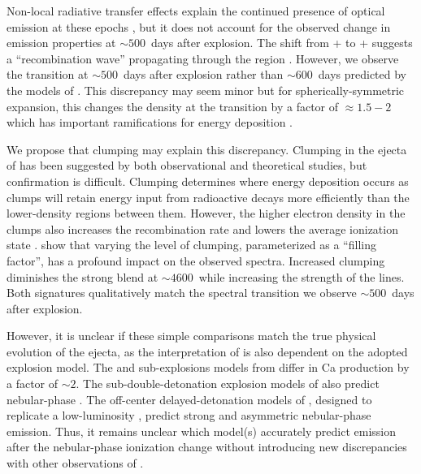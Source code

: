 \documentclass[twocolumn]{aastex63}
\begin{document}
Non-local radiative transfer effects explain the continued presence of optical emission at these epochs \citep{fransson2015}, but it does not account for the observed change in emission properties at $\sim 500$~days after explosion. The shift from + to + suggests a ``recombination wave'' propagating through the  region \citep{graur2020}. However, we observe the transition at $\sim 500$~days after explosion rather than $\sim 600$~days predicted by the models of \citet[][see their Fig. 1]{fransson2015}. This discrepancy may seem minor but for spherically-symmetric expansion, this changes the density at the transition by a factor of $\approx 1.5-2$ which has important ramifications for energy deposition \citep[c.f., ][]{axelrod1980}. 

We propose that clumping may explain this discrepancy. Clumping in the ejecta of \sneia has been suggested by both observational \citep[e.g., ][]{black2016, mazzali2020} and theoretical \citep[e.g., ][]{wilk2020} studies, but confirmation is difficult. Clumping determines where energy deposition occurs as clumps will retain energy input from radioactive decays more efficiently than the lower-density regions between them. However, the higher electron density in the clumps also increases the recombination rate and lowers the average ionization state \citep[e.g., ][]{mazzali2020}. \citet{wilk2020} show that varying the level of clumping, parameterized as a ``filling factor'', has a profound impact on the observed spectra. Increased clumping diminishes the strong  blend at $\sim 4600$~\AAA while increasing the strength of the \CaII lines. Both signatures qualitatively match the spectral transition we observe $\sim 500$~days after explosion. 

However, it is unclear if these simple comparisons match the true physical evolution of the ejecta, as the interpretation of \CaII is also dependent on the adopted explosion model. The \Mch and sub-\Mch explosions models from \citet{wilk2020} differ in Ca production by a factor of $\sim 2$. The sub-\Mch double-detonation explosion models of \citet{polin2021} also predict nebular-phase \CaII. The off-center \Mch delayed-detonation models of \citet{hoeflich2021}, designed to replicate a low-luminosity \snia, predict strong and asymmetric nebular-phase \CaII emission. Thus, it remains unclear which model(s) accurately predict \CaII emission after the nebular-phase ionization change without introducing new discrepancies with other observations of \name.  
\end{document}
